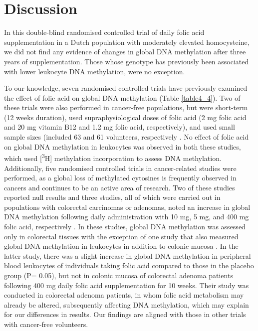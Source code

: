 \section[]{Discussion} %
\noindent In this double-blind randomised controlled trial of daily folic acid supplementation in a Dutch population with moderately elevated homocysteine, we did not find any evidence of changes in global DNA methylation after three years of supplementation. Those whose genotype has previously been associated with lower leukocyte DNA methylation, were no exception. 
 
\noindent To our knowledge, seven randomised controlled trials have previously examined the effect of folic acid on global DNA methylation (Table \ref{table4_4}). Two of these trials were also performed in cancer-free populations, but were short-term (12 weeks duration), used supraphysiological doses of folic acid (2 mg folic acid and 20 mg vitamin B12 and 1.2 mg folic acid, respectively), and used small sample sizes (included 63 and 61 volunteers, respectively \cite{c434,c435}. No effect of folic acid on global DNA methylation in leukocytes was observed in both these studies, which used [\textsuperscript{3}H] methylation incorporation to assess DNA methylation. Additionally, five randomised controlled trials in cancer-related studies were performed, as a global loss of methylated cytosines is frequently observed in cancers \cite{c436} and continues to be an active area of research. Two of these studies reported null results \cite{c437,c438} and three studies, all of which were carried out in populations with colorectal 
carcinomas or adenomas, noted an increase in global DNA methylation following daily administration with 10 mg, 5 mg, and 400 mg folic acid, respectively \cite{c439,c440,c441}. In these studies, global DNA methylation was assessed only in colorectal tissues with the exception of one study that also measured global DNA methylation in leukocytes in addition to colonic mucosa \cite{c441}. In the latter study, there was a slight increase in global DNA methylation in peripheral blood leukocytes of individuals taking folic acid compared to those in the placebo group (P= 0.05), but not in colonic mucosa of colorectal adenoma patients following 400 mg daily folic acid supplementation for 10 weeks. Their study was conducted in colorectal adenoma patients, in whom folic acid metabolism may already be altered, subsequently affecting DNA methylation, which may explain for our differences in results. Our findings are aligned with those in other trials with cancer-free volunteers.

